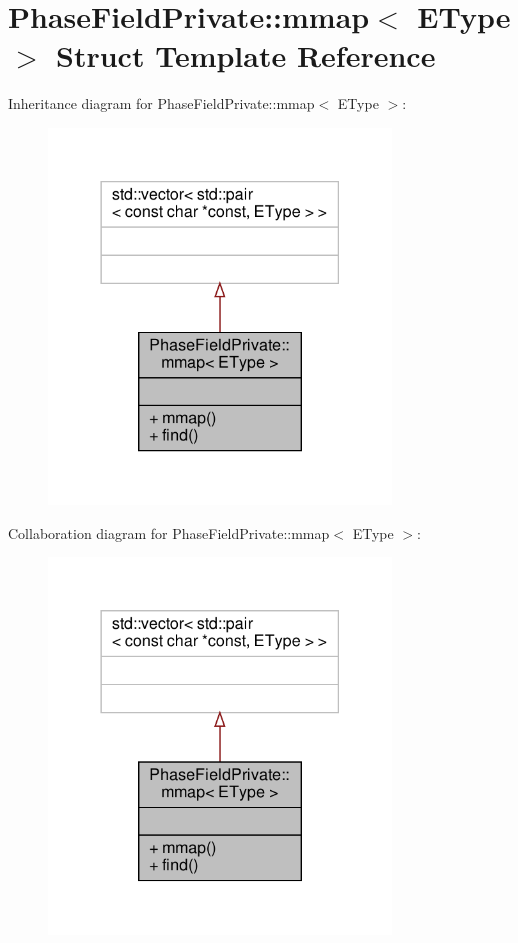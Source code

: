 \hypertarget{structPhaseFieldPrivate_1_1mmap}{}\section{Phase\+Field\+Private\+:\+:mmap$<$ E\+Type $>$ Struct Template Reference}
\label{structPhaseFieldPrivate_1_1mmap}


Inheritance diagram for Phase\+Field\+Private\+:\+:mmap$<$ E\+Type $>$\+:\nopagebreak
\begin{figure}[H]
\begin{center}
\leavevmode
\includegraphics[width=258pt]{structPhaseFieldPrivate_1_1mmap__inherit__graph}
\end{center}
\end{figure}


Collaboration diagram for Phase\+Field\+Private\+:\+:mmap$<$ E\+Type $>$\+:\nopagebreak
\begin{figure}[H]
\begin{center}
\leavevmode
\includegraphics[width=258pt]{structPhaseFieldPrivate_1_1mmap__coll__graph}
\end{center}
\end{figure}
